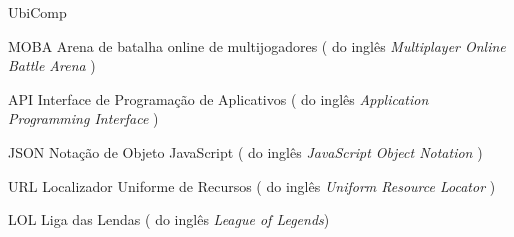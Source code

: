 \begin{listofabbrv}{UbiComp}
	

	  \item [MOBA]        Arena de batalha online de multijogadores ( do inglês \textit{Multiplayer Online Battle Arena} )

  	\item [API]        Interface de Programação de Aplicativos ( do inglês \textit{Application Programming Interface} )
  	\item [JSON]        Notação de Objeto JavaScript ( do inglês \textit{ JavaScript Object Notation} )
  	\item [URL]        Localizador Uniforme de Recursos ( do inglês \textit{Uniform Resource Locator} )
  	\item [LOL]	 Liga das Lendas ( do inglês \textit{League of Legends})
    
\end{listofabbrv}